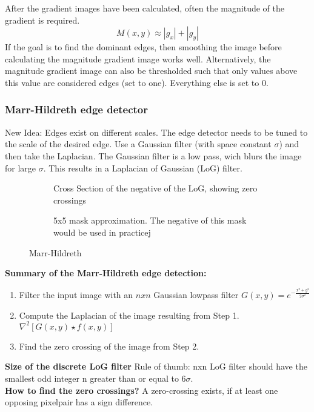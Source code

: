 After the gradient images have been calculated, often the magnitude of the gradient is required.
\[
	M(x,y) \approx |g_x|+|g_y|
\]
If the goal is to find the dominant edges, then smoothing the image before calculating the magnitude gradient image works well. Alternatively, the magnitude gradient image can also be thresholded such that only values above this value are considered edges (set to one). Everything else is set to 0.

\subsubsection{Marr-Hildreth edge detector}
New Idea: Edges exist on different scales. The edge detector needs to be tuned to the scale of the desired edge. Use a Gaussian filter (with space constant $\sigma$) and then take the Laplacian. The Gaussian filter is a low pass, wich blurs the image for large $\sigma$. This results in a Laplacian of Gaussian (LoG) filter.
\begin{figure}[h]
	\centering
	\begin{subfigure}[b]{0.45\textwidth}
		\centering
		\caption{Cross Section of the negative of the LoG, showing zero crossings}
	\end{subfigure}
	\begin{subfigure}[b]{0.45\textwidth}
		\centering
		\caption{5x5 mask approximation. The negative of this mask would be used in practicej}
	\end{subfigure}
	\caption{Marr-Hildreth}
\end{figure}

\textbf{Summary of the Marr-Hildreth edge detection:}
\begin{enumerate}
\item Filter the input image with an $n x n$ Gaussian lowpass filter $G(x,y)=e^{-\frac{x^2+y^2}{2\sigma^2}}$
\item Compute the Laplacian of the image resulting from Step 1. $\nabla ^2[G(x,y) \star f(x,y)]$
\item Find the zero crossing of the image from Step 2.
\end{enumerate}
\textbf{Size of the discrete LoG filter}
Rule of thumb: nxn LoG filter should have the smallest odd integer n greater than or equal to $6\sigma$.\\
\textbf{How to find the zero crossings?}
A zero-crossing exists, if at least one opposing pixelpair has a sign difference.

